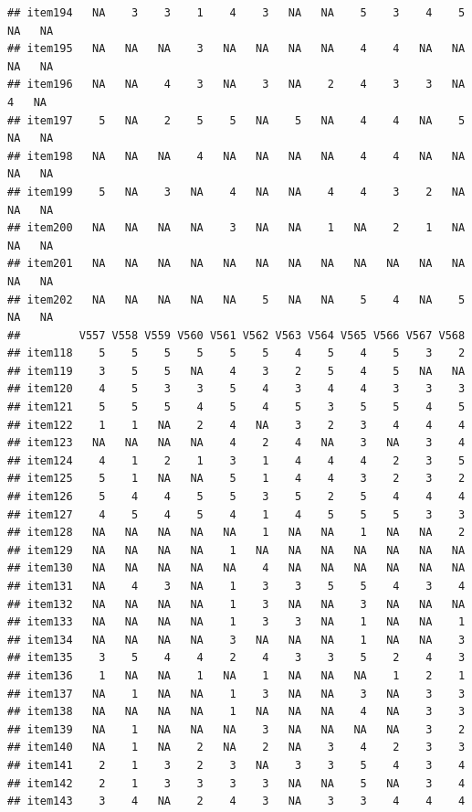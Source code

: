 \documentclass[
  man]{apa6}
\begin{document}
\begin{verbatim}
## item194   NA    3    3    1    4    3   NA   NA    5    3    4    5   NA   NA
## item195   NA   NA   NA    3   NA   NA   NA   NA    4    4   NA   NA   NA   NA
## item196   NA   NA    4    3   NA    3   NA    2    4    3    3   NA    4   NA
## item197    5   NA    2    5    5   NA    5   NA    4    4   NA    5   NA   NA
## item198   NA   NA   NA    4   NA   NA   NA   NA    4    4   NA   NA   NA   NA
## item199    5   NA    3   NA    4   NA   NA    4    4    3    2   NA   NA   NA
## item200   NA   NA   NA   NA    3   NA   NA    1   NA    2    1   NA   NA   NA
## item201   NA   NA   NA   NA   NA   NA   NA   NA   NA   NA   NA   NA   NA   NA
## item202   NA   NA   NA   NA   NA    5   NA   NA    5    4   NA    5   NA   NA
##         V557 V558 V559 V560 V561 V562 V563 V564 V565 V566 V567 V568
## item118    5    5    5    5    5    5    4    5    4    5    3    2
## item119    3    5    5   NA    4    3    2    5    4    5   NA   NA
## item120    4    5    3    3    5    4    3    4    4    3    3    3
## item121    5    5    5    4    5    4    5    3    5    5    4    5
## item122    1    1   NA    2    4   NA    3    2    3    4    4    4
## item123   NA   NA   NA   NA    4    2    4   NA    3   NA    3    4
## item124    4    1    2    1    3    1    4    4    4    2    3    5
## item125    5    1   NA   NA    5    1    4    4    3    2    3    2
## item126    5    4    4    5    5    3    5    2    5    4    4    4
## item127    4    5    4    5    4    1    4    5    5    5    3    3
## item128   NA   NA   NA   NA   NA    1   NA   NA    1   NA   NA    2
## item129   NA   NA   NA   NA    1   NA   NA   NA   NA   NA   NA   NA
## item130   NA   NA   NA   NA   NA    4   NA   NA   NA   NA   NA   NA
## item131   NA    4    3   NA    1    3    3    5    5    4    3    4
## item132   NA   NA   NA   NA    1    3   NA   NA    3   NA   NA   NA
## item133   NA   NA   NA   NA    1    3    3   NA    1   NA   NA    1
## item134   NA   NA   NA   NA    3   NA   NA   NA    1   NA   NA    3
## item135    3    5    4    4    2    4    3    3    5    2    4    3
## item136    1   NA   NA    1   NA    1   NA   NA   NA    1    2    1
## item137   NA    1   NA   NA    1    3   NA   NA    3   NA    3    3
## item138   NA   NA   NA   NA    1   NA   NA   NA    4   NA    3    3
## item139   NA    1   NA   NA   NA    3   NA   NA   NA   NA    3    2
## item140   NA    1   NA    2   NA    2   NA    3    4    2    3    3
## item141    2    1    3    2    3   NA    3    3    5    4    3    4
## item142    2    1    3    3    3    3   NA   NA    5   NA    3    4
## item143    3    4   NA    2    4    3   NA    3    3    4    4    4

\end{verbatim}
\end{document}
